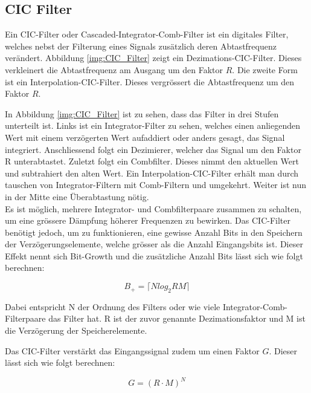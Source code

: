 \subsection{CIC Filter}\label{subsec:CIC_Filter}

Ein CIC-Filter oder Cascaded-Integrator-Comb-Filter ist ein digitales Filter, welches nebst der Filterung eines Signals zusätzlich deren Abtastfrequenz verändert. Abbildung \ref{img:CIC_Filter} zeigt ein Dezimations-CIC-Filter. Dieses verkleinert die Abtastfrequenz am Ausgang um den Faktor \(R\). Die zweite Form ist ein Interpolation-CIC-Filter. Dieses vergrössert die Abtastfrequenz um den Faktor \(R\).

In Abbildung \ref{img:CIC_Filter} ist zu sehen, dass das Filter in drei Stufen unterteilt ist. Links ist ein Integrator-Filter zu sehen, welches einen anliegenden Wert mit einem verzögerten Wert aufaddiert oder anders gesagt, das Signal integriert. Anschliessend folgt ein Dezimierer, welcher das Signal um den Faktor R unterabtastet. Zuletzt folgt ein Combfilter. Dieses nimmt den aktuellen Wert und subtrahiert den alten Wert. Ein Interpolation-CIC-Filter erhält man durch tauschen von Integrator-Filtern mit Comb-Filtern und umgekehrt. Weiter ist nun in der Mitte eine Überabtastung nötig.\\
Es ist möglich, mehrere Integrator- und Combfilterpaare zusammen zu schalten, um eine grössere Dämpfung höherer Frequenzen zu bewirken. Das CIC-Filter benötigt jedoch, um zu funktionieren, eine gewisse Anzahl Bits in den Speichern der Verzögerungselemente, welche grösser als die Anzahl Eingangsbits ist. Dieser Effekt nennt sich Bit-Growth und die zusätzliche Anzahl Bits lässt sich wie folgt berechnen\cite{cic_a}\cite{cic_h}:

\begin{equation}
B_+ = \big \lceil Nlog_2RM \big \rceil
\label{equ:cic_bitgrowth}
\end{equation}

Dabei entspricht N der Ordnung des Filters oder wie viele Integrator-Comb-Filterpaare das Filter hat. R ist der zuvor genannte Dezimationsfaktor und M ist die Verzögerung der Speicherelemente.

Das CIC-Filter verstärkt das Eingangssignal zudem um einen Faktor \(G\). Dieser lässt sich wie folgt berechnen:

 \begin{equation}
 G = (R\cdot M)^N
 \label{equ:cic_gain}
 \end{equation}
 
